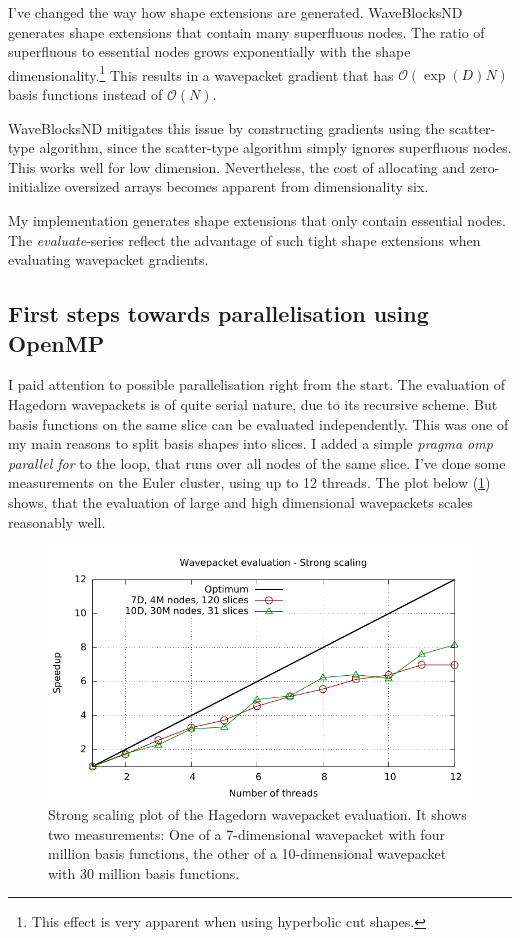 \documentclass{article}
\begin{document}
I've changed the way how shape extensions are generated. WaveBlocksND generates
shape extensions that contain many superfluous nodes. The ratio of superfluous to
essential nodes grows exponentially with the shape
dimensionality.\footnote{This effect is very apparent when using hyperbolic cut shapes.}
This results in a wavepacket gradient that has \(\mathcal{O}(\exp{}(D) N)\) basis functions instead of
\(\mathcal{O}(N)\).

WaveBlocksND mitigates this issue by constructing gradients using the scatter-type algorithm,
since the scatter-type algorithm simply ignores superfluous nodes. This works well for low dimension.
Nevertheless, the cost of allocating and zero-initialize oversized arrays
becomes apparent from dimensionality six.

My implementation generates shape extensions that only contain essential no\-des.
The \emph{evaluate}-series reflect the advantage of such tight shape extensions
when evaluating wavepacket gradients.

\subsection{First steps towards parallelisation using OpenMP}

I paid attention to possible parallelisation right from the start.
The evaluation of Hagedorn wavepackets is of quite serial nature, due to its
recursive scheme. But basis functions on the same slice can be evaluated independently.
This was one of my main reasons to split basis shapes into slices.
I added a simple \emph{pragma omp parallel for} to the loop, that runs over all nodes
of the same slice. I've done some measurements on the Euler cluster, using up to 12 threads.
The plot below (\ref{fig:hawp_eval_omp}) shows, that the evaluation of large and high dimensional
wavepackets scales reasonably well.

\begin{figure}[H]
  \centering
  \includegraphics[width=1.0\textwidth]{plots/hawp_eval_omp}
  \caption{
    Strong scaling plot of the Hagedorn wavepacket evaluation.
    It shows two measurements: One of a 7-dimensional wavepacket with
    four million basis functions, the other of a 10-dimensional wavepacket with
    30 million basis functions.
  }
  \label{fig:hawp_eval_omp}
\end{figure}
\end{document}
